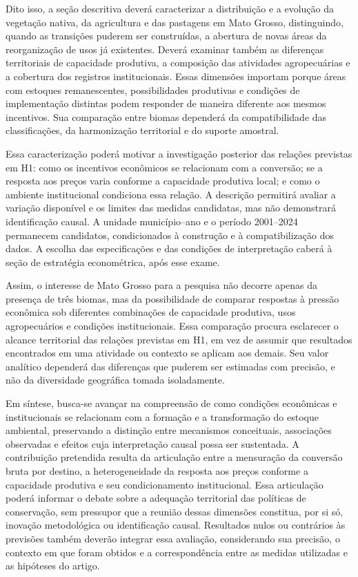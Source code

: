 Dito isso, a seção descritiva deverá caracterizar a distribuição e a evolução da vegetação nativa, da agricultura e das pastagens em Mato Grosso, distinguindo, quando as transições puderem ser construídas, a abertura de novas áreas da reorganização de usos já existentes. Deverá examinar também as diferenças territoriais de capacidade produtiva, a composição das atividades agropecuárias e a cobertura dos registros institucionais. Essas dimensões importam porque áreas com estoques remanescentes, possibilidades produtivas e condições de implementação distintas podem responder de maneira diferente aos mesmos incentivos. Sua comparação entre biomas dependerá da compatibilidade das classificações, da harmonização territorial e do suporte amostral.

Essa caracterização poderá motivar a investigação posterior das relações previstas em H1: como os incentivos econômicos se relacionam com a conversão; se a resposta aos preços varia conforme a capacidade produtiva local; e como o ambiente institucional condiciona essa relação. A descrição permitirá avaliar a variação disponível e os limites das medidas candidatas, mas não demonstrará identificação causal. A unidade município--ano e o período 2001--2024 permanecem candidatos, condicionados à construção e à compatibilização dos dados. A escolha das especificações e das condições de interpretação caberá à seção de estratégia econométrica, após esse exame.

Assim, o interesse de Mato Grosso para a pesquisa não decorre apenas da presença de três biomas, mas da possibilidade de comparar respostas à pressão econômica sob diferentes combinações de capacidade produtiva, usos agropecuários e condições institucionais. Essa comparação procura esclarecer o alcance territorial das relações previstas em H1, em vez de assumir que resultados encontrados em uma atividade ou contexto se aplicam aos demais. Seu valor analítico dependerá das diferenças que puderem ser estimadas com precisão, e não da diversidade geográfica tomada isoladamente.

Em síntese, busca-se avançar na compreensão de como condições econômicas e institucionais se relacionam com a formação e a transformação do estoque ambiental, preservando a distinção entre mecanismos conceituais, associações observadas e efeitos cuja interpretação causal possa ser sustentada. A contribuição pretendida resulta da articulação entre a mensuração da conversão bruta por destino, a heterogeneidade da resposta aos preços conforme a capacidade produtiva e seu condicionamento institucional. Essa articulação poderá informar o debate sobre a adequação territorial das políticas de conservação, sem pressupor que a reunião dessas dimensões constitua, por si só, inovação metodológica ou identificação causal. Resultados nulos ou contrários às previsões também deverão integrar essa avaliação, considerando sua precisão, o contexto em que foram obtidos e a correspondência entre as medidas utilizadas e as hipóteses do artigo.
